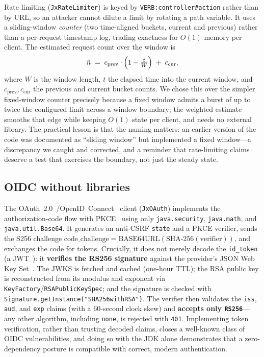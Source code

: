 Rate limiting (\texttt{JxRateLimiter}) is keyed by
\texttt{VERB:controller\#action} rather than by URL, so an attacker
cannot dilute a limit by rotating a path variable. It uses a
sliding-window \emph{counter} (two time-aligned buckets, current and
previous) rather than a per-request timestamp log, trading exactness
for $O(1)$ memory per client. The estimated request count over the
window is
\[
  \hat{n} \;=\; c_{\text{prev}} \cdot \Bigl(1 - \tfrac{t}{W}\Bigr) \;+\; c_{\text{cur}},
\]
where $W$ is the window length, $t$ the elapsed time into the current
window, and $c_{\text{prev}}, c_{\text{cur}}$ the previous and current
bucket counts. We chose this over the simpler fixed-window counter
precisely because a fixed window admits a burst of up to twice the
configured limit across a window boundary; the weighted estimate
smooths that edge while keeping $O(1)$ state per client, and needs no
external library. The practical lesson is that the naming matters:
an earlier version of the code was documented as ``sliding window''
but implemented a fixed window---a discrepancy we caught and corrected,
and a reminder that rate-limiting claims deserve a test that exercises
the boundary, not just the steady state.

\subsection{OIDC without libraries}

The OAuth~2.0~\cite{rfc6749}/OpenID~Connect~\cite{oidc} client
(\texttt{JxOAuth}) implements the authorization-code flow with
PKCE~\cite{rfc7636} using only \texttt{java.security},
\texttt{java.math}, and \texttt{java.util.Base64}. It generates an
anti-CSRF \texttt{state} and a PKCE verifier, sends the S256 challenge
$\text{code\_challenge} = \text{BASE64URL}(\text{SHA-256}(\text{verifier}))$,
and exchanges the code for tokens. Crucially, it does not merely decode
the \texttt{id\_token} (a JWT~\cite{rfc7519}): it \textbf{verifies the
RS256 signature} against the provider's JSON Web Key
Set~\cite{rfc7517}. The JWKS is fetched and cached (one-hour
TTL); the RSA public key is reconstructed from its modulus and exponent
via \texttt{KeyFactory}/\texttt{RSAPublicKeySpec}; and the signature is
checked with \texttt{Signature.getInstance("SHA256withRSA")}. The
verifier then validates the \texttt{iss}, \texttt{aud}, and \texttt{exp}
claims (with a 60-second clock skew) and \textbf{accepts only
\texttt{RS256}}---any other algorithm, including \texttt{none}, is
rejected with \texttt{401}. Implementing token verification, rather
than trusting decoded claims, closes a well-known class of OIDC
vulnerabilities, and doing so with the JDK alone demonstrates that a
zero-dependency posture is compatible with correct, modern
authentication.

